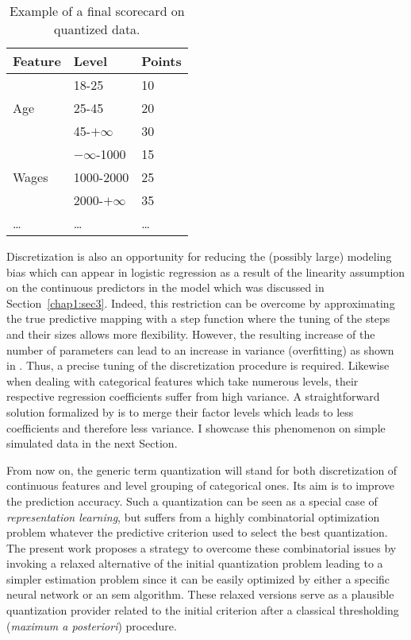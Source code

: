 \begin{table}
\centering
\begin{tabular}{p{3cm}|p{3cm}|p{2cm}}
Feature & Level & Points \\
\hline
\hline
\multirow{3}{*}{Age} & 18-25 & 10 \\
 & 25-45 & 20 \\
 & 45-$+\infty$ & 30 \\
 \hline
\multirow{3}{*}{Wages} & $-\infty$-1000 & 15 \\
 & 1000-2000 & 25 \\
 & 2000-$+\infty$ & 35 \\
 \dots & \dots & \dots \\
\end{tabular}
\caption{\label{tab:ex_scorecard} Example of a final scorecard on quantized data.}
\end{table}


Discretization is also an opportunity for reducing the (possibly large) modeling bias which can appear in logistic regression as a result of the linearity assumption on the continuous predictors in the model which was discussed in Section~\ref{chap1:sec3}. Indeed, this restriction can be overcome by approximating the true predictive mapping with a step function where the tuning of the steps and their sizes allows more flexibility. However, the resulting increase of the number of parameters can lead to an increase in variance (overfitting) as shown in \cite{yang2009discretization}. Thus, a precise tuning of the discretization procedure is required. Likewise when dealing with categorical features which take numerous levels, their respective regression coefficients suffer from high variance. A straightforward solution formalized by \cite{maj2015delete} is to merge their factor levels which leads to less coefficients and therefore less variance. I showcase this phenomenon on simple simulated data in the next Section.

From now on, the generic term quantization will stand for both discretization of continuous features and level grouping of categorical ones. Its aim is to improve the prediction accuracy. Such a quantization can be seen as a special case of \textit{representation learning}, but suffers from a highly combinatorial optimization problem whatever the predictive criterion used to select the best quantization. The present work proposes a strategy to overcome these combinatorial issues by invoking a relaxed alternative of the initial quantization problem leading to a simpler estimation problem since it can be easily optimized by either a specific neural network or an \gls{sem} algorithm. These relaxed versions serve as a plausible quantization provider related to the initial criterion after a classical thresholding (\textit{maximum a posteriori}) procedure.

